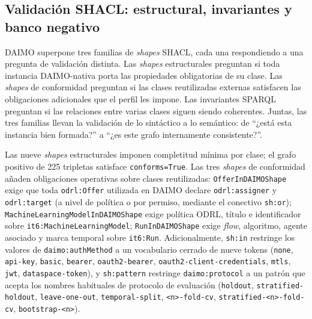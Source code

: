 \documentclass[Afour,sagev,times]{sagej}
\newcommand{\code}[1]{\texttt{#1}}
\begin{document}
\subsection{Validación SHACL: estructural, invariantes y banco negativo}\label{sec:eval-shacl}

DAIMO superpone tres familias de \emph{shapes} SHACL, cada una respondiendo a una pregunta de validación distinta. Las \emph{shapes} estructurales preguntan si toda instancia DAIMO-nativa porta las propiedades obligatorias de su clase. Las \emph{shapes} de conformidad preguntan si las clases reutilizadas externas satisfacen las obligaciones adicionales que el perfil les impone. Las invariantes SPARQL preguntan si las relaciones entre varias clases siguen siendo coherentes. Juntas, las tres familias llevan la validación de lo sintáctico a lo semántico: de ``¿está esta instancia bien formada?'' a ``¿es este grafo internamente consistente?''.

Las nueve \emph{shapes} estructurales imponen completitud mínima por clase; el grafo positivo de 225 tripletas satisface \code{conforms=True}. Las tres \emph{shapes} de conformidad añaden obligaciones operativas sobre clases reutilizadas: \code{OfferInDAIMOShape} exige que toda \code{odrl:Offer} utilizada en DAIMO declare \code{odrl:assigner} y \code{odrl:target} (a nivel de política o por permiso, mediante el conectivo \code{sh:or}); \code{MachineLearningModelInDAIMOShape} exige política ODRL, título e identificador sobre \code{it6:MachineLearningModel}; \code{RunInDAIMOShape} exige \emph{flow}, algoritmo, agente asociado y marca temporal sobre \code{it6:Run}. Adicionalmente, \code{sh:in} restringe los valores de \code{daimo:authMethod} a un vocabulario cerrado de nueve tokens (\code{none}, \code{api-key}, \code{basic}, \code{bearer}, \code{oauth2-bearer}, \code{oauth2-client-credentials}, \code{mtls}, \code{jwt}, \code{dataspace-token}), y \code{sh:pattern} restringe \code{daimo:protocol} a un patrón que acepta los nombres habituales de protocolo de evaluación (\code{holdout}, \code{stratified-holdout}, \code{leave-one-out}, \code{temporal-split}, \code{<n>-fold-cv}, \code{stratified-<n>-fold-cv}, \code{bootstrap-<n>}).
\end{document}

